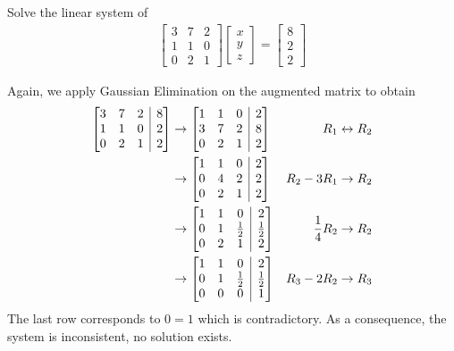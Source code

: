 \begin{exmp}
\label{exmp:nosol}
Solve the linear system of
\begin{align*}
\begin{bmatrix}
3 & 7 & 2 \\
1 & 1 & 0 \\
0 & 2 & 1 
\end{bmatrix}
\begin{bmatrix}
x \\
y \\
z
\end{bmatrix}
=
\begin{bmatrix}
8 \\
2 \\
2
\end{bmatrix}   
\end{align*}
\end{exmp}
\begin{solution} Again, we apply Gaussian Elimination on the augmented matrix to obtain
\begin{align*}
\left[\begin{array}{@{}ccc|c@{}}
3 & 7 & 2 & 8 \\
1 & 1 & 0 & 2 \\
0 & 2 & 1 & 2
\end{array}\right] 
& \to 
\left[\begin{array}{@{}ccc|c@{}}
1 & 1 & 0 & 2 \\
3 & 7 & 2 & 8 \\
0 & 2 & 1 & 2
\end{array}\right] 
& R_1 \leftrightarrow R_2 \\
& \to 
\left[\begin{array}{@{}ccc|c@{}}
1 & 1 & 0 & 2 \\
0 & 4 & 2 & 2 \\
0 & 2 & 1 & 2
\end{array}\right] 
& R_2-3R_1 \to R_2 \\
& \to 
\left[\begin{array}{@{}ccc|c@{}}
1 & 1 & 0 & 2 \\
0 & 1 & \frac{1}{2} & \frac{1}{2} \\
0 & 2 & 1 & 2
\end{array}\right] 
& \frac{1}{4}R_2 \to R_2 \\
& \to 
\left[\begin{array}{@{}ccc|c@{}}
1 & 1 & 0 & 2 \\
0 & 1 & \frac{1}{2} & \frac{1}{2} \\
0 & 0 & 0 & 1
\end{array}\right] 
& R_3 - 2R_2 \to R_3
\end{align*}
The last row corresponds to $0 = 1$ which is contradictory. As a consequence, the system is inconsistent, no solution exists.
\end{solution}



